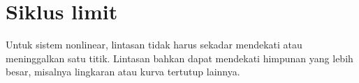

\sectionnewpage

\section{Siklus limit}
\label{limitcycles:section}


Untuk sistem nonlinear, lintasan tidak harus sekadar mendekati atau
meninggalkan satu titik. Lintasan bahkan dapat mendekati himpunan yang lebih
besar, misalnya lingkaran atau kurva tertutup lainnya.

